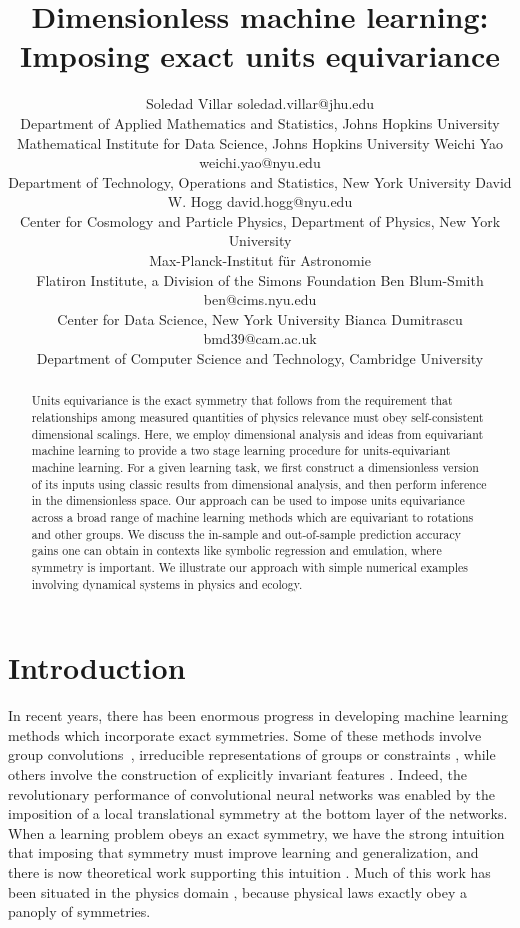 \documentclass[twoside,11pt]{article}
\title{ Dimensionless machine learning: \\ Imposing exact units equivariance}
\author{\name Soledad Villar \email soledad.villar@jhu.edu \\
       \addr Department of Applied Mathematics and Statistics, Johns Hopkins University\\
       \addr Mathematical Institute for Data Science, Johns Hopkins University
       \AND
       \name Weichi Yao \email weichi.yao@nyu.edu\\
       \addr Department of Technology, Operations and Statistics, New York University
       \AND
       \name David W. Hogg \email david.hogg@nyu.edu \\
       \addr Center for Cosmology and Particle Physics, Department of Physics, New York University\\
       \addr Max-Planck-Institut f\"ur Astronomie\\
       \addr Flatiron Institute, a Division of the Simons Foundation
       \AND
       \name Ben Blum-Smith \email ben@cims.nyu.edu \\
       \addr Center for Data Science, New York University
       \AND
       \name Bianca Dumitrascu \email bmd39@cam.ac.uk\\
       \addr Department of Computer Science and Technology, Cambridge University
       }
\begin{document}
\maketitle
\thispagestyle{empty}

\begin{abstract}\noindent
Units equivariance is the exact symmetry that follows from the requirement that relationships among measured quantities of physics relevance must obey self-consistent dimensional scalings. Here, we employ dimensional analysis and ideas from equivariant machine learning to provide a two stage learning procedure for units-equivariant machine learning. For a given learning task, we first construct a dimensionless version of its inputs using classic results from dimensional analysis, and then perform inference in the dimensionless space. Our approach can be used to impose units equivariance across a broad range of machine learning methods which are equivariant to rotations and other groups. We discuss the in-sample and out-of-sample prediction accuracy gains one can obtain in contexts like symbolic regression and emulation, where symmetry is important. We illustrate our approach with simple numerical examples involving dynamical systems in physics and ecology.
\end{abstract}

\section{Introduction}\label{sec:intro}
In recent years, there has been enormous progress in developing machine learning methods which incorporate exact symmetries. Some of these methods involve group convolutions~\citep{cohen2016group,Cohen2016steerable,wang2020certified}, irreducible representations of groups \citep{fuchs2020se,kondor2018n,thomas2018tensor,weiler20183d,cohen2018spherical,Weiler2019e2equivariant} or
constraints \citep{finzi},
while others involve the construction of explicitly invariant features \citep{gripaios2021lorentz, haddadin2021invariant, villar, yao}.
Indeed, the revolutionary performance of convolutional neural networks \citep{lecun1989backpropagation} was enabled by the imposition of a local translational symmetry at the bottom layer of the networks.
When a learning problem obeys an exact symmetry, we have the strong intuition that imposing that symmetry must improve learning and generalization, and there is now theoretical work supporting this intuition \citep{elesedy2021provably, bietti2021sample, mei2021learning}.
Much of this work has been situated in the physics domain \citep{yu-physics,kashinath2021physics}, because physical laws exactly obey a panoply of symmetries.
\end{document}
